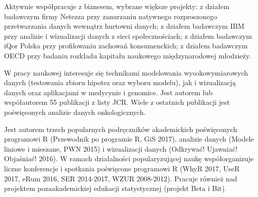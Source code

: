 \documentclass[\main/boa.tex]{subfiles}
\begin{document}
Aktywnie współpracuje z biznesem, wybrane większe projekty: z działem badawczym firmy Netezza przy zanurzaniu natywnego rozproszonego przetwarzania danych wewnątrz hurtowni danych; z działem badawczym IBM przy analizie i wizualizacji danych z sieci społecznościach; z działem badawczym iQor Polska przy profilowaniu zachowań konsumenckich; z działem badawczym OECD przy badaniu rozkładu kapitału naukowego międzynarodowej młodzieży.

W pracy naukowej interesuje się technikami modelowania wysokowymiarowych danych (testowania zbioru hipotez oraz wyboru modelu), jak i wizualizacją danych oraz aplikacjami w medycynie i genomice. Jest autorem lub współautorem 55 publikacji z listy JCR. Wiele z ostatnich publikacji jest poświęconych analizie danych onkologicznych.

Jest autorem trzech popularnych podręczników akademickich poświęconych programowi R (Przewodnik po programie R, GiS 2017), analizie danych (Modele liniowe i mieszane, PWN 2015) i wizualizacji danych (Odkrywać! Ujawniać! Objaśniać! 2016). W ramach działalności popularyzującej naukę współorganizuje liczne konferencje i spotkania poświęcone programowi R (WhyR 2017, UseR 2017, eRum 2016, SER 2014-2017, WZUR 2008-2012). Pracuje również nad projektem pozaakademickiej edukacji statystycznej (projekt Beta i Bit).
\end{document}
